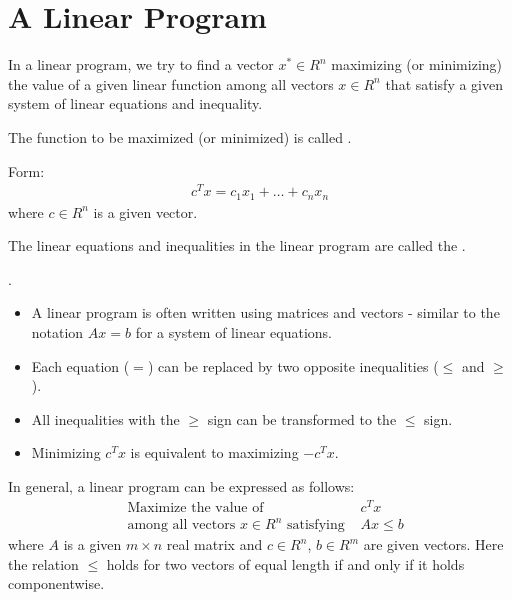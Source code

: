 \chapter{A Linear Program}
  \par In a linear program, we try to find a vector $x^* \in R^n$ maximizing (or minimizing) the value of a given linear function among all vectors $x \in R^n$ that satisfy a given system of linear equations and inequality.

  \par The function to be maximized (or minimized) is called .
  \par Form:
    \begin{align*}
      c^T x = c_1 x_1 + \ldots + c_n x_n
    \end{align*}
    where $c \in R^n$ is a given vector.

  \par The linear equations and inequalities in the linear program are called the .
  \par {}.

  \begin{itemize}
    \item A linear program is often written using matrices and vectors - similar to the notation $Ax = b$ for a system of linear equations.
    \item Each equation ($=$) can be replaced by two opposite inequalities ($\leq$ and $\geq$).
    \item All inequalities with the $\geq$ sign can be transformed to the $\leq$ sign.
    \item Minimizing $c^T x$ is equivalent to maximizing $-c^T x$.
  \end{itemize}

  \par In general, a linear program can be expressed as follows:
  \begin{align*}
    & \text{Maximize the value of} & c^T x \\
    & \text{among all vectors } x \in R^n \text{ satisfying } & Ax \leq b
  \end{align*}
  where $A$ is a given $m \times n$ real matrix and $c \in R^n$, $b \in R^m$ are given vectors. Here the relation $\leq$ holds for two vectors of equal length if and only if it holds componentwise.

